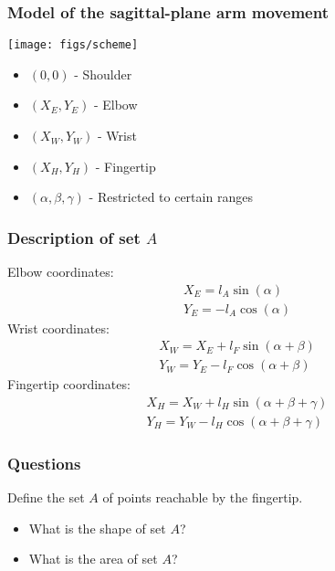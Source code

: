 \documentclass{beamer}
\begin{document}
\begin{frame}
\frametitle{Model of the sagittal-plane arm movement}
\parbox{6.5cm}{
  \texttt{[image: figs/scheme]}
}
\hfill
\parbox{4.5cm}{
\begin{itemize}
\item $(0,0)$ - Shoulder
\item $(X_E,Y_E)$ - Elbow
\item $(X_W,Y_W)$ - Wrist
\item $(X_H,Y_H)$ - Fingertip
\item $(\alpha,\beta,\gamma)$ - Restricted to certain ranges
\end{itemize}
}
\end{frame}


\begin{frame}
\frametitle{Description of set $A$}

Elbow coordinates:
%
\begin{align}\label{firstcoord}
X_E = l_A\sin(\alpha) \\
Y_E = -l_A\cos(\alpha)
\end{align}
%
Wrist coordinates:
%
\begin{align}
X_W = X_E + l_F\sin(\alpha+\beta) \\
Y_W = Y_E - l_F\cos(\alpha+\beta)
\end{align}
%
Fingertip coordinates:
%
\begin{align}
X_H = X_W + l_H\sin(\alpha+\beta+\gamma) \\
Y_H = Y_W - l_H\cos(\alpha+\beta+\gamma) \label{lastcoord}
\end{align}

\end{frame}


\begin{frame}
\frametitle{Questions}
Define the set $A$ of points reachable by the fingertip.
\begin{block}{}
\begin{itemize}
\item What is the shape of set $A$?
\item What is the area of set $A$?
\end{itemize}
\end{block}
\end{frame}
\end{document}
